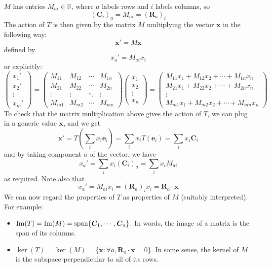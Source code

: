 \documentclass{article}
\begin{document}
$M$ has entries $M_{ai} \in \mathbb R$, where $a$ labels rows and $i$ labels columns, so
\[ (\bm C_i)_a = M_{ai} = (\bm R_a)_i \]
The action of $T$ is then given by the matrix $M$ multiplying the vector $\bm x$ in the following way:
\[ \bm x' = M \bm x \]
defined by
\[ x_a' = M_{ai}x_i \]
or explicitly:
\[
	\begin{pmatrix}
		x_1' \\ x_2' \\ \vdots \\ x_m'
	\end{pmatrix}
	=
	\begin{pmatrix}
		M_{11} & M_{12} & \cdots & M_{1n} \\
		M_{21} & M_{22} & \cdots & M_{2n} \\
		\vdots & \vdots & \ddots & \vdots \\
		M_{m1} & M_{m2} & \cdots & M_{mn}
	\end{pmatrix}
	\begin{pmatrix}
		x_1 \\ x_2 \\ \vdots \\ x_n
	\end{pmatrix}
	=
	\begin{pmatrix}
		M_{11} x_1 + M_{12} x_2 + \cdots + M_{1n} x_n \\
		M_{21} x_1 + M_{22} x_2 + \cdots + M_{2n} x_n \\
		\vdots                                        \\
		M_{m1} x_1 + M_{m2} x_2 + \cdots + M_{mn} x_n
	\end{pmatrix}
\]
To check that the matrix multiplication above gives the action of $T$, we can plug in a generic value $\bm x$, and we get
\[ \bm x' = T\left(\sum_i x_i \bm e_i\right) = \sum_i x_i T(\bm e_i) = \sum_i x_i \bm C_i \]
and by taking component $a$ of the vector, we have
\[ x_a' = \sum_i x_i (\bm C_i)_a = \sum_i x_i M_{ai} \]
as required. Note also that
\[ x_a' = M_{ai}x_i = (\bm R_a)_i x_i = \bm R_a \cdot \bm x \]
We can now regard the properties of $T$ as properties of $M$ (suitably interpreted). For example:
\begin{itemize}
	\item $\Im(T) = \Im(M) = \operatorname{span} \{ \bm C_1, \cdots, \bm C_n \}$. In words, the image of a matrix is the span of its columns.
	\item $\ker(T) = \ker(M) = \{ \bm x: \forall a, \bm R_a \cdot \bm x = 0 \}$. In some sense, the kernel of $M$ is the subspace perpendicular to all of its rows.
\end{itemize}
\end{document}
